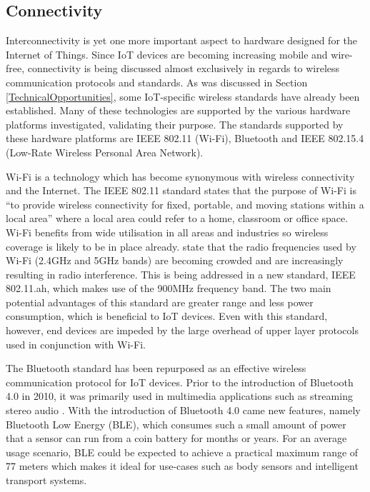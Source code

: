     \subsection{Connectivity}
      Interconnectivity is yet one more important aspect to hardware designed for the Internet of Things. Since IoT devices are becoming increasing mobile and wire-free, connectivity is being discussed almost exclusively in regards to wireless communication protocols and standards. As was discussed in Section \ref{TechnicalOpportunities}, some IoT-specific wireless standards have already been established. Many of these technologies are supported by the various hardware platforms investigated, validating their purpose. The standards supported by these hardware platforms are IEEE 802.11 (Wi-Fi), Bluetooth and IEEE 802.15.4 (Low-Rate Wireless Personal Area Network). 

      Wi-Fi is a technology which has become synonymous with wireless connectivity and the Internet. The IEEE 802.11 standard states that the purpose of Wi-Fi is ``to provide wireless connectivity for fixed, portable, and moving stations within a local area'' where a local area could refer to a home, classroom or office space. Wi-Fi benefits from wide utilisation in all areas and industries so wireless coverage is likely to be in place already. \citet{wifiah:2012} state that the radio frequencies used by Wi-Fi (2.4GHz and 5GHz bands) are becoming crowded and are increasingly resulting in radio interference. This is being addressed in a new standard, IEEE 802.11.ah, which makes use of the 900MHz frequency band. The two main potential advantages of this standard are greater range and less power consumption, which is beneficial to IoT devices. Even with this standard, however, end devices are impeded by the large overhead of upper layer protocols used in conjunction with Wi-Fi.

      The Bluetooth standard has been repurposed as an effective wireless communication protocol for IoT devices. Prior to the introduction of Bluetooth 4.0 in 2010, it was primarily used in multimedia applications such as streaming stereo audio \citep{bluetooth:2014}. With the introduction of Bluetooth 4.0 came new features, namely Bluetooth Low Energy (BLE), which consumes such a small amount of power that a sensor can run from a coin battery for months or years. For an average usage scenario, BLE could be expected to achieve a practical maximum range of 77 meters \citep{linklabs:2015} which makes it ideal for use-cases such as body sensors and intelligent transport systems.

